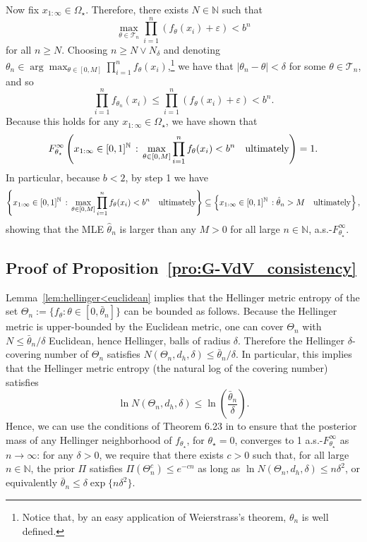 \documentclass[11pt,twoside]{article}
\def\NN{\mathbb{N}}
\begin{document}
Now fix $x_{1:\infty}\in\Omega_\star$. Therefore, there exists $N\in\NN$ such that
%
\begin{equation*}
    \max_{\theta\in\mathcal T_n}\prod_{i=1}^n (f_\theta(x_i)+\varepsilon) < b^n
\end{equation*}
%
for all $n\geq N$. Choosing $n\geq N\lor N_\delta$ and denoting $\theta_n \in\arg\max_{\theta\in[0,M]} \prod_{i=1}^n f_\theta(x_i)$,\footnote{Notice that, by an easy application of Weierstrass's theorem, $\theta_n$ is well defined.} we have that $|\theta_n-\theta|<\delta$ for some $\theta\in\mathcal T_n$, and so
%
\begin{equation*}
    \prod_{i=1}^n f_{\theta_n}(x_i) \leq \prod_{i=1}^n (f_{\theta}(x_i)+\varepsilon) < b^n.
\end{equation*}
%
Because this holds for any $x_{1:\infty}\in\Omega_\star$, we have shown that
%
\begin{equation*}
    F_{\theta_\star}^\infty \left(x_{1:\infty}\in [0,1]^\NN \, :\,  \max_{\theta\in[0,M]}\prod_{i=1}^n f_\theta(x_i) < b^n \quad \textnormal{ultimately}\right) = 1.
\end{equation*}
%
In particular, because $b<2$, by step 1 we have
%
\begin{equation*}
    \left\{x_{1:\infty}\in [0,1]^\NN \, :\,  \max_{\theta\in[0,M]}\prod_{i=1}^n f_\theta(x_i) < b^n \quad \textnormal{ultimately}\right\} \subseteq \left\{x_{1:\infty}\in [0,1]^\NN \, :\hat\theta_n >M \quad \textnormal{ultimately}\right\},
\end{equation*}
%
showing that the MLE $\hat \theta_n$ is larger than any $M>0$ for all large $n\in\NN$, a.s.-$F_{\theta_\star}^\infty$.


\subsection*{Proof of Proposition~\ref{pro:G-VdV_consistency}}%

Lemma~\ref{lem:hellinger<euclidean} implies that the Hellinger metric entropy of the set $\Theta_n := \{f_\theta : \theta \in [0, \bar\theta_n]\}$ can be bounded as follows. Because the Hellinger metric is upper-bounded by the Euclidean metric, one can cover $\Theta_n$ with $N\leq \bar\theta_n/\delta$ Euclidean, hence Hellinger, balls of radius $\delta$. Therefore the Hellinger $\delta$-covering number of $\Theta_n$ satisfies $N(\Theta_n, d_h, \delta) \leq \bar\theta_n/\delta$. In particular, this implies that the Hellinger metric entropy (the natural log of the covering number) satisfies
%
\begin{equation*}
    \ln N(\Theta_n, d_h, \delta) \leq  \ln\left(\frac{\bar\theta_n}{\delta}\right).
\end{equation*}
%
Hence, we can use the conditions of Theorem 6.23 in \cite{ghosal2017fundamentals} to ensure that the posterior mass of any Hellinger neighborhood of $f_{\theta_\star}$, for $\theta_\star =0$, converges to 1 a.s.-$F_{\theta_\star}^{\infty}$ as $n\to\infty$: for any $\delta>0$, we require that there exists $c>0$ such that, for all large $n\in\NN$, the prior $\Pi$ satisfies $\Pi(\Theta_n^c)\leq e^{-c n}$ as long as $\ln N(\Theta_n, d_h, \delta)\leq n\delta^2$, or equivalently $\bar\theta_n\leq \delta \exp\{n\delta^2\}$.
\end{document}
